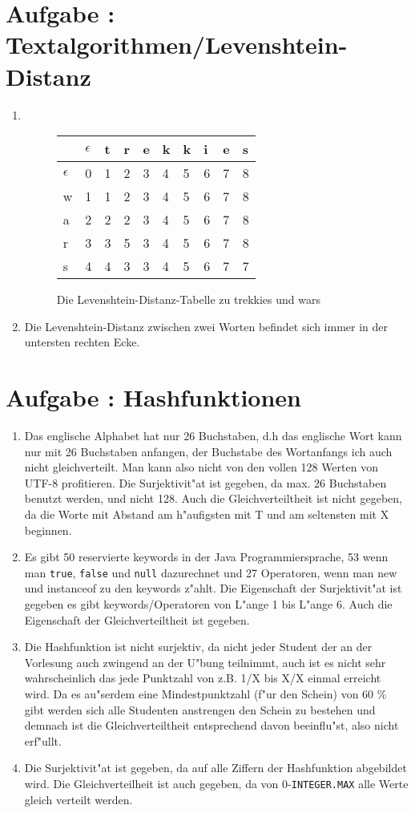 \documentclass[12pt]{article}
\newcounter{exnum}
\newcommand{\aufgabe}[1]{\section*{Aufgabe \theexnum\stepcounter{exnum}: #1}} %
\begin{document}
\aufgabe{Textalgorithmen/Levenshtein-Distanz}
\begin{enumerate}
\item \text{}\\ 
\begin{figure}[!h]
\centering
\begin{tabular}{|l|l|l|l|l|l|l|l|l|l|}
\hline
  & $\epsilon$  & t & r & e & k & k & i & e & s \\ \hline
$\epsilon$  & 0 & 1 & 2 & 3 & 4 & 5 & 6 & 7 & 8 \\ \hline
w & 1 & 1 & 2 & 3 & 4 & 5 & 6 & 7 & 8 \\ \hline
a & 2 & 2 & 2 & 3 & 4 & 5 & 6 & 7 & 8 \\ \hline
r & 3 & 3 & 5 & 3 & 4 & 5 & 6 & 7 & 8 \\ \hline
s & 4 & 4 & 3 & 3 & 4 & 5 & 6 & 7 & 7 \\ \hline
\end{tabular}
\caption{Die Levenshtein-Distanz-Tabelle zu trekkies und wars}
\end{figure}
\item Die Levenshtein-Distanz zwischen zwei Worten befindet sich immer in der untersten rechten Ecke.
\end{enumerate}
\aufgabe{Hashfunktionen}
\begin{enumerate}
\item Das englische Alphabet hat nur 26 Buchstaben, d.h das englische Wort kann nur mit 26 Buchstaben anfangen, der Buchstabe des Wortanfangs ich auch nicht gleichverteilt. Man kann also nicht von den vollen 128 Werten von UTF-8 profitieren.
Die Surjektivit"at ist gegeben, da max. 26 Buchstaben benutzt werden, und nicht 128. Auch die Gleichverteiltheit ist nicht gegeben, da die Worte mit Abstand am h"aufigsten mit T und am seltensten mit X beginnen.


\item Es gibt 50 reservierte keywords in der Java Programmiersprache, 53 wenn man \verb|true|, \verb|false| und \verb|null| dazurechnet und 27 Operatoren, wenn man new und instanceof zu den keywords z"ahlt.
Die Eigenschaft der Surjektivit"at ist gegeben es gibt keywords/Operatoren von L"ange 1 bis L"ange 6.
Auch die Eigenschaft der Gleichverteiltheit ist gegeben. 


\item Die Hashfunktion ist nicht surjektiv, da nicht jeder Student der an der Vorlesung auch zwingend an der U"bung teilnimmt, auch ist es nicht sehr wahrscheinlich das jede Punktzahl von z.B. 1/X bis X/X einmal erreicht wird. Da es au"serdem eine Mindestpunktzahl (f"ur den Schein) von 60 \% gibt werden sich alle Studenten anstrengen den Schein zu bestehen und demnach ist die Gleichverteiltheit entsprechend davon beeinflu"st, also nicht erf"ullt.



\item Die Surjektivit"at ist gegeben, da auf alle Ziffern der Hashfunktion abgebildet wird.
Die Gleichverteilheit ist auch gegeben, da von 0-\verb|INTEGER.MAX| alle Werte gleich verteilt werden.
\end{enumerate}
\newpage
\end{document}
